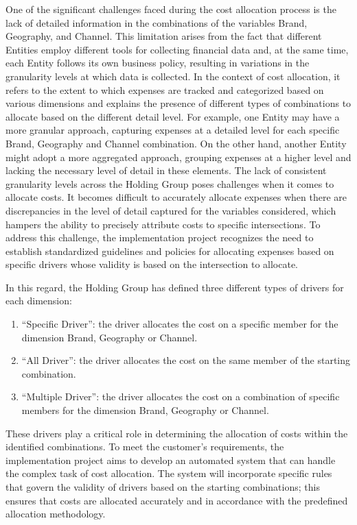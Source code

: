 \documentclass[12pt,a4paper,openright,twoside]{book}
\begin{document}
One of the significant challenges faced during the cost allocation process is the lack of detailed information in the combinations of the variables Brand, Geography, and Channel.
%
This limitation arises from the fact that different Entities employ different tools for collecting financial data and, at the same time, each Entity follows its own business policy, resulting in variations in the granularity levels at which data is collected.
%
In the context of cost allocation, it refers to the extent to which expenses are tracked and categorized based on various dimensions and explains the presence of different types of combinations to allocate based on the different detail level.
%
For example, one Entity may have a more granular approach, capturing expenses at a detailed level for each specific Brand, Geography and Channel combination. 
%
On the other hand, another Entity might adopt a more aggregated approach, grouping expenses at a higher level and lacking the necessary level of detail in these elements.
%
The lack of consistent granularity levels across the Holding Group poses challenges when it comes to allocate costs.
%
It becomes difficult to accurately allocate expenses when there are discrepancies in the level of detail captured for the variables considered, which hampers the ability to precisely attribute costs to specific intersections.
%
To address this challenge, the implementation project recognizes the need to establish standardized guidelines and policies for allocating expenses based on specific drivers whose validity is based on the intersection to allocate.

In this regard, the Holding Group has defined three different types of drivers for each dimension:

\begin{enumerate}
    \item ``Specific Driver'': the driver allocates the cost on a specific member for the dimension Brand, Geography or Channel.
    \item ``All Driver'': the driver allocates the cost on the same member of the starting combination.
    \item ``Multiple Driver'': the driver allocates the cost on a combination of specific members for the dimension Brand, Geography or Channel.
\end{enumerate}

These drivers play a critical role in determining the allocation of costs within the identified combinations.
%
To meet the customer's requirements, the implementation project aims to develop an automated system that can handle the complex task of cost allocation. 
%
The system will incorporate specific rules that govern the validity of drivers based on the starting combinations; this ensures that costs are allocated accurately and in accordance with the predefined allocation methodology.
\end{document}
